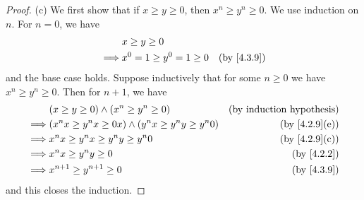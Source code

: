\begin{proof}{(c)}
  We first show that if \(x \geq y \geq 0\), then \(x^n \geq y^n \geq 0\).
  We use induction on \(n\).
  For \(n = 0\), we have
  \begin{align*}
             & x \geq y \geq 0                                        \\
    \implies & x^0 = 1 \geq y^0 = 1 \geq 0 & \text{(by \cref{4.3.9})}
  \end{align*}
  and the base case holds.
  Suppose inductively that for some \(n \geq 0\) we have \(x^n \geq y^n \geq 0\).
  Then for \(n + 1\), we have
  \begin{align*}
             & (x \geq y \geq 0) \land (x^n \geq y^n \geq 0)                  & \text{(by induction hypothesis)} \\
    \implies & (x^n x \geq y^n x \geq 0x) \land (y^n x \geq y^n y \geq y^n 0) & \text{(by \cref{4.2.9}(e))}      \\
    \implies & x^n x \geq y^n x \geq y^n y \geq y^n 0                         & \text{(by \cref{4.2.9}(c))}      \\
    \implies & x^n x \geq y^n y \geq 0                                        & \text{(by \cref{4.2.2})}         \\
    \implies & x^{n + 1} \geq y^{n + 1} \geq 0                                & \text{(by \cref{4.3.9})}
  \end{align*}
  and this closes the induction.


\end{proof}
